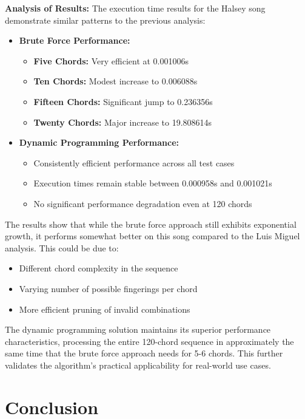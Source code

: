 \documentclass[conference]{IEEEtran}
\begin{document}
\textbf{Analysis of Results:}
The execution time results for the Halsey song demonstrate similar patterns to the previous analysis:

\begin{itemize}
    \item \textbf{Brute Force Performance:}
    \begin{itemize}
        \item \textbf{Five Chords:} Very efficient at 0.001006s
        \item \textbf{Ten Chords:} Modest increase to 0.006088s
        \item \textbf{Fifteen Chords:} Significant jump to 0.236356s
        \item \textbf{Twenty Chords:} Major increase to 19.808614s
    \end{itemize}
    
    \item \textbf{Dynamic Programming Performance:}
    \begin{itemize}
        \item Consistently efficient performance across all test cases
        \item Execution times remain stable between 0.000958s and 0.001021s
        \item No significant performance degradation even at 120 chords
    \end{itemize}
\end{itemize}

The results show that while the brute force approach still exhibits exponential growth, it performs somewhat better on this song compared to the Luis Miguel analysis. This could be due to:

\begin{itemize}
    \item Different chord complexity in the sequence
    \item Varying number of possible fingerings per chord
    \item More efficient pruning of invalid combinations
\end{itemize}

The dynamic programming solution maintains its superior performance characteristics, processing the entire 120-chord sequence in approximately the same time that the brute force approach needs for 5-6 chords. This further validates the algorithm's practical applicability for real-world use cases.

\section{Conclusion}



\end{document}
